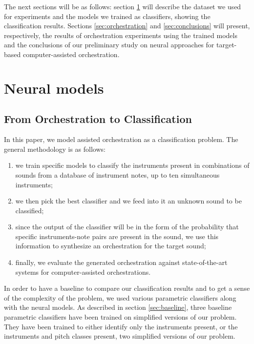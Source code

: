 \documentclass[runningheads,a4paper]{llncs}
\begin{document}
The next sections will be as follows: section \ref{sec:models} will describe the dataset we used for experiments and the models we trained as classifiers, showing the classification results. Sections \ref{sec:orchestration} and \ref{sec:conclusions} will present, respectively, the results of orchestration experiments using the trained models and the conclusions of our preliminary study on neural approaches for target-based computer-assisted orchestration.



\section{Neural models}
\label{sec:models}

\subsection{From Orchestration to Classification}

In this paper, we model assisted orchestration as a classification problem. The general methodology is as follows:

\begin{enumerate}
\item we train specific models to classify the instruments present in combinations of sounds from a database of instrument notes, up to ten simultaneous instruments;
\item we then pick the best classifier and we feed into it an unknown sound to be classified;
\item since the output of the classifier will be in the form of the probability that specific instruments-note pairs are present in the sound, we use this information to synthesize an orchestration for the target sound;
\item finally, we evaluate the generated orchestration against state-of-the-art systems for computer-assisted orchestrations.
\end{enumerate}

In order to have a baseline to compare our classification results and to get a sense of the complexity of the problem, we used various parametric classifiers along with the neural models. As described in section \ref{sec:baseline}, three baseline parametric classifiers have been trained on simplified versions of our problem. They have been trained to either identify only the instruments present, or the instruments and pitch classes present, two simplified versions of our problem.
\end{document}
